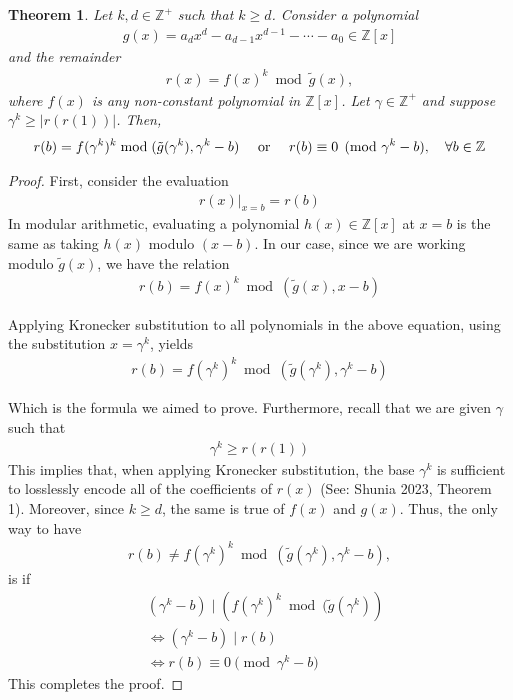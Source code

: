 \documentclass[12pt,reqno]{article}
\theoremstyle{plain}
\newtheorem{theorem}{Theorem}
\theoremstyle{definition}
\newcommand{\eval}[2]{\left . #1 \right|_{#2}}
\begin{document}
\begin{theorem} \label{theorem:kroneckerqrings}
Let $k, d \in \mathbb{Z}^+$ such that $k \geq d$. Consider a polynomial
\begin{align*}
g(x) = a_d x^d - a_{d-1} x^{d-1} - \cdots - a_0 \in \mathbb{Z}[x]
\end{align*}
and the remainder
\begin{align*}
r(x) = f(x)^k  \bmod{\tilde{g}(x)} ,
\end{align*}
where $f(x)$ is any non-constant polynomial in $\mathbb{Z}[x]$. Let $\gamma \in \mathbb{Z}^+$ and suppose $\gamma^k \geq |r(r(1))|$. Then,
\begin{align*}
r(b) = f(\gamma^k)^k \bmod{(\tilde{g}(\gamma^k), \gamma^k - b)} \quad \textup{ or } \quad r(b) \equiv 0 \pmod{\gamma^k - b}, \quad \forall b \in \mathbb{Z}
\end{align*}

\end{theorem}
\begin{proof}
First, consider the evaluation 
\begin{align*}
    \eval{r(x)}{x=b} = r(b)
\end{align*}
In modular arithmetic, evaluating a polynomial $h(x) \in \mathbb{Z}[x]$ at $x=b$ is the same as taking $h(x)$ modulo $(x - b)$. In our case, since we are working modulo $\tilde{g}(x)$, we have the relation
\begin{align*}
    r(b) = f(x)^k \bmod{(\tilde{g}(x), x - b)}
\end{align*}

Applying Kronecker substitution to all polynomials in the above equation, using the substitution $x = \gamma^k$, yields
\begin{align*}
    r(b) = f(\gamma^k)^k \bmod{(\tilde{g}(\gamma^k), \gamma^k - b)}
\end{align*}

Which is the formula we aimed to prove. Furthermore, recall that we are given $\gamma$ such that
\begin{align*}
    \gamma^k \geq r(r(1))
\end{align*}
This implies that, when applying Kronecker substitution, the base $\gamma^k$ is sufficient to losslessly encode all of the coefficients of $r(x)$ \cite{shunia2023simple} (See: Shunia 2023, Theorem 1). Moreover, since $k \geq d$, the same is true of $f(x)$ and $g(x)$. Thus, the only way to have
\begin{align}
    r(b) \not= f(\gamma^k)^k \bmod{(\tilde{g}(\gamma^k), \gamma^k - b)} ,
\end{align}
is if
\begin{align*}
    & (\gamma^k - b) \mid (f(\gamma^k)^k \bmod{(\tilde{g}(\gamma^k)}) \\
    & \Longleftrightarrow (\gamma^k - b) \mid r(b) \\
    & \Longleftrightarrow r(b) \equiv 0 \pmod{\gamma^k - b}
\end{align*}
This completes the proof.
\end{proof}
\end{document}
